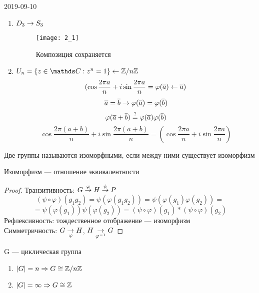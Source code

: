 \documentclass[main]{subfiles}
\begin{document}
\begin{lect} {2019-09-10}
	\begin{examples}
	    \begin{enumerate}
	        \item $D_3 \rightarrow S_3$
			\begin{figure}[H]
				\begin{center}
					\texttt{[image: 2\_1]}
					\caption{Композиция сохраняется}
				\end{center}
			\end{figure}
	        \item $U_n=\{z\in \CC: z^n=1\} \la \Z / n \Z$\\
		        \[(\cos \frac{2\pi a}{n}+i \sin \frac{2\pi a}{n} = \varphi (\overline{a}) \leftarrow \overline{a})\]
		        \[\overline{a}=\overline{b} \rightarrow \varphi(\overline{a})=\varphi(\overline{b})\]
		        \[\varphi(\overline{a}+\overline{b}) \overset{?}{=} \varphi(\overline{a})\varphi(\overline{b})\]
		        \[\cos \frac{2\pi(a+b)}{n}+i \sin \frac{2\pi(a+b)}{n}=(\cos\frac{2\pi a}{n} + i \sin \frac{2\pi a}{n})\]
	    \end{enumerate}
	\end{examples}

	\begin{definition}
	    Две группы называются изоморфными, если между ними существует изоморфизм
	\end{definition}

	\begin{utv}
	    Изоморфизм --- отношение эквивалентности
	\end{utv}

	\begin{proof}
	    Транзитивность: $G \overset{\varphi}{\rightarrow} H \overset{\psi}{\rightarrow} P$
        \[(\psi \circ \varphi)(g_1 g_2) = \psi(\varphi(g_1 g_2)) = \psi(\varphi(g_1) \varphi(g_2)) = \]
		\[= \psi(\varphi(g_1)) \psi(\varphi(g_2)) =
        (\psi \circ \varphi)(g_1) * (\psi \circ \varphi)(g_2)\]
	    Рефлексивность: тождественное отображение --- изоморфизм\\
	    Симметричность: $G \underset{\varphi}{\rightarrow} H$, $H \underset{\varphi^{-1}}{\rightarrow} G$
	\end{proof}

	\begin{theorem}
	    G --- циклическая группа
		\begin{enumerate}
			\item $|G|=n \Rightarrow G \cong \mathbb{Z} / n \mathbb{Z}$\\
			\item $|G|=\infty \Rightarrow G \cong \mathbb{Z}$
		\end{enumerate}
	\end{theorem}


\end{lect}
\end{document}
